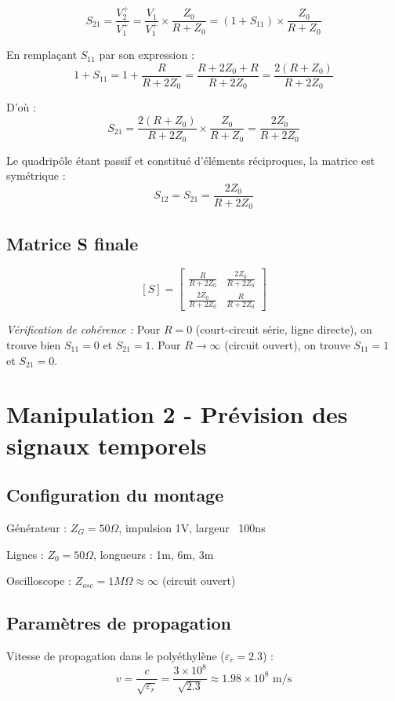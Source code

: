 \documentclass[12pt,a4paper]{article}
\begin{document}
$$S_{21} = \frac{V_2^+}{V_1^+} = \frac{V_1}{V_1^+} \times \frac{Z_0}{R + Z_0} = (1 + S_{11}) \times \frac{Z_0}{R + Z_0}$$

En remplaçant $S_{11}$ par son expression :
$$1 + S_{11} = 1 + \frac{R}{R + 2Z_0} = \frac{R + 2Z_0 + R}{R + 2Z_0} = \frac{2(R + Z_0)}{R + 2Z_0}$$

D'où :
$$S_{21} = \frac{2(R + Z_0)}{R + 2Z_0} \times \frac{Z_0}{R + Z_0} = \frac{2Z_0}{R + 2Z_0}$$

Le quadripôle étant passif et constitué d'éléments réciproques, la matrice est symétrique :
$$S_{12} = S_{21} = \frac{2Z_0}{R + 2Z_0}$$

\subsection{Matrice S finale}

$$[S] = \begin{bmatrix}
\frac{R}{R + 2Z_0} & \frac{2Z_0}{R + 2Z_0} \\
\frac{2Z_0}{R + 2Z_0} & \frac{R}{R + 2Z_0}
\end{bmatrix}$$

\textit{Vérification de cohérence :} Pour $R=0$ (court-circuit série, ligne directe), on trouve bien $S_{11}=0$ et $S_{21}=1$. Pour $R \to \infty$ (circuit ouvert), on trouve $S_{11}=1$ et $S_{21}=0$.

\section{Manipulation 2 - Prévision des signaux temporels}

\subsection{Configuration du montage}

Générateur : $Z_G = 50\Omega$, impulsion 1V, largeur ~100ns

Lignes : $Z_0 = 50\Omega$, longueurs : 1m, 6m, 3m

Oscilloscope : $Z_{osc} = 1M\Omega \approx \infty$ (circuit ouvert)

\subsection{Paramètres de propagation}

Vitesse de propagation dans le polyéthylène ($\varepsilon_r = 2.3$) :
$$v = \frac{c}{\sqrt{\varepsilon_r}} = \frac{3 \times 10^8}{\sqrt{2.3}} \approx 1.98 \times 10^8 \text{ m/s}$$
\end{document}
